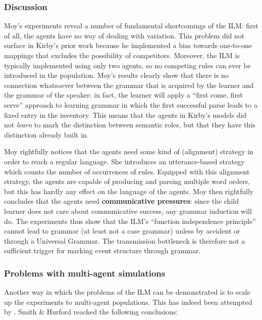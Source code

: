 \subsubsection{Discussion}
Moy's experiments reveal a number of fundamental shortcomings of the ILM: first of all, the agents have no way of dealing with variation. This problem did not surface in Kirby's prior work because he implemented a bias towards one-to-one mappings that excludes the possibility of competitors. Moreover, the ILM is typically implemented using only two agents, so no competing rules can ever be introduced in the population. Moy's results clearly show that there is no connection whatsoever between the grammar that is acquired by the learner and the grammar of the speaker: in fact, the learner will apply a ``first come, first serve'' approach to learning grammar in which the first successful parse leads to a fixed entry in the inventory. This means that the agents in Kirby's models did not {\em learn} to mark the distinction between semantic roles, but that they have this distinction already built in.

Moy rightfully notices that the agents need some kind of (alignment) strategy in order to reach a regular language. She introduces an utterance-based strategy which counts the number of occurrences of rules. Equipped with this alignment strategy, the agents are capable of producing and parsing multiple word orders, but this has hardly any effect on the language of the agents. Moy then rightfully concludes that the agents need {\bfseries communicative pressures}: since the child learner does not care about communicative success, any grammar induction will do. The experiments thus show that the ILM's ``function independence principle'' cannot lead to grammar (at least not a case grammar) unless by accident or through a Universal Grammar. The transmission bottleneck is therefore not a sufficient trigger for marking event structure through grammar.


\subsubsection{Problems with multi-agent simulations}
Another way in which the problems of the ILM can be demonstrated is to scale up the experiments to multi-agent populations. This has indeed been attempted by \citet{smith03language}. Smith \& Hurford reached the following conclusions:

